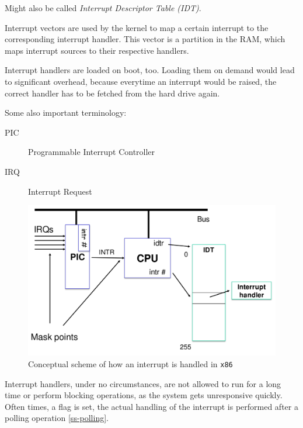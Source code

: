 \documentclass[english]{panikzettel}
\begin{document}
	\begin{halfboxl}
		Might also be called \textit{Interrupt Descriptor Table (IDT)}.
		
		Interrupt vectors are used by the kernel to map a certain interrupt to the corresponding interrupt handler.
		This vector is a partition in the RAM, which maps interrupt sources to their respective handlers. 
		
		Interrupt handlers are loaded on boot, too. 
		Loading them on demand would lead to significant overhead, because everytime an interrupt would be raised, the correct handler has to be fetched from the hard  drive again.
		
		Some also important terminology:
		\begin{description}
			\item[PIC] Programmable Interrupt Controller
			\item[IRQ] Interrupt Request
		\end{description}
	\end{halfboxl}%
	\begin{halfboxr}
		\begin{figure}[H]
			\centering
			\includegraphics[width=\textwidth]{img/3-interrupt-handling-img.png}
			\caption{Conceptual scheme of how an interrupt is handled in \texttt{x86}}
			\label{img-3-interrupt-handling-img}
		\end{figure}
	\end{halfboxr}

	Interrupt handlers, under no circumstances, are not allowed to run for a long time or perform blocking operations, as the system gets unresponsive quickly.
	Often times, a flag is set, the actual handling of the interrupt is performed after a polling operation \cref{ss-polling}.
	
\end{document}
